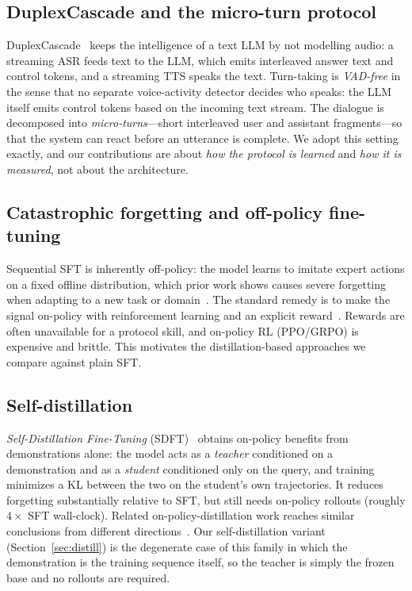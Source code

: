 \documentclass[conference]{IEEEtran}
\begin{document}
\subsection{DuplexCascade and the micro-turn protocol}
DuplexCascade~\cite{duplexcascade} keeps the intelligence of a text LLM by not
modelling audio: a streaming ASR feeds text to the LLM, which emits interleaved
answer text and control tokens, and a streaming TTS speaks the text. Turn-taking
is \emph{VAD-free} in the sense that no separate voice-activity detector decides
who speaks: the LLM itself emits control tokens based on the incoming text
stream. The dialogue is decomposed into \emph{micro-turns}---short interleaved
user and assistant fragments---so that the system can react before an utterance
is complete. We adopt this setting exactly, and our contributions are about
\emph{how the protocol is learned} and \emph{how it is measured}, not about the
architecture.

\subsection{Catastrophic forgetting and off-policy fine-tuning}
Sequential SFT is inherently off-policy: the model learns to imitate expert
actions on a fixed offline distribution, which prior work shows causes severe
forgetting when adapting to a new task or
domain~\cite{kirkpatrick2017,lifhoiem2017,mecklenburg2024}. The standard remedy
is to make the signal on-policy with reinforcement learning and an explicit
reward~\cite{chu2025,airef}. Rewards are often unavailable for a protocol skill,
and on-policy RL (PPO/GRPO) is expensive and brittle. This motivates the
distillation-based approaches we compare against plain SFT.

\subsection{Self-distillation}
\emph{Self-Distillation Fine-Tuning} (SDFT)~\cite{selfdistill2026} obtains
on-policy benefits from demonstrations alone: the model acts as a \emph{teacher}
conditioned on a demonstration and as a \emph{student} conditioned only on the
query, and training minimizes a KL between the two on the student's own
trajectories. It reduces forgetting substantially relative to SFT, but still
needs on-policy rollouts (roughly $4\times$ SFT wall-clock). Related
on-policy-distillation work reaches similar conclusions from different
directions~\cite{tml2025,airef,rlsrazor2025,bai2022,snell2022}. Our
self-distillation variant (Section~\ref{sec:distill}) is the degenerate case of
this family in which the demonstration is the training sequence itself, so the
teacher is simply the frozen base and no rollouts are required.
\end{document}
